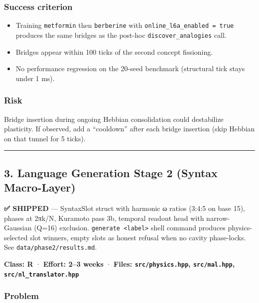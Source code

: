 \documentclass[
  11pt,
  a4paper,
]{article}
\providecommand{\tightlist}{%
  \setlength{\itemsep}{0pt}\setlength{\parskip}{0pt}}
\begin{document}
\subsubsection{Success criterion}\label{success-criterion-1}

\begin{itemize}
\tightlist
\item
  Training \texttt{metformin} then \texttt{berberine} with
  \texttt{online\_l6a\_enabled\ =\ true} produces the same bridges as
  the post-hoc \texttt{discover\_analogies} call.
\item
  Bridges appear within 100 ticks of the second concept fissioning.
\item
  No performance regression on the 20-seed benchmark (structural tick
  stays under 1 ms).
\end{itemize}

\subsubsection{Risk}\label{risk}

Bridge insertion during ongoing Hebbian consolidation could destabilize
plasticity. If observed, add a ``cooldown'' after each bridge insertion
(skip Hebbian on that tunnel for 5 ticks).

\begin{center}\rule{0.5\linewidth}{0.5pt}\end{center}

\subsection{3. Language Generation Stage 2 (Syntax
Macro-Layer)}\label{language-generation-stage-2-syntax-macro-layer}

\textbf{✅ SHIPPED} --- SyntaxSlot struct with harmonic ω ratios (3:4:5
on base 15), phases at 2πk/N, Kuramoto pass 3b, temporal readout head
with narrow-Gaussian (Q=16) exclusion.
\texttt{generate\ \textless{}label\textgreater{}} shell command produces
physics-selected slot winners, empty slots as honest refusal when no
cavity phase-locks. See \texttt{data/phase2/results.md}.

\textbf{Class: R} · \textbf{Effort: 2--3 weeks} · \textbf{Files:
\texttt{src/physics.hpp}, \texttt{src/mal.hpp},
\texttt{src/nl\_translator.hpp}}

\subsubsection{Problem}\label{problem-2}
\end{document}
